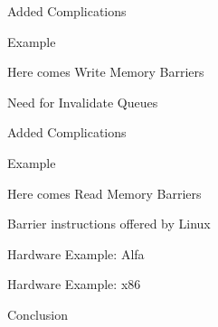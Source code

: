 \documentclass[notes, xcolor = dvipsnames]{beamer}
\begin{document}
    \begin{frame}{Added Complications}
        
    \end{frame}

    \begin{frame}{Example}

    \end{frame}

    \begin{frame}{Here comes Write Memory Barriers}
        
    \end{frame}

    \begin{frame}{Need for Invalidate Queues}
        
    \end{frame}

    \begin{frame}{Added Complications}
        
    \end{frame}

    \begin{frame}{Example}
        
    \end{frame}

    \begin{frame}{Here comes Read Memory Barriers}
        
    \end{frame}

    \begin{frame}{Barrier instructions offered by Linux}
        
    \end{frame}

    \begin{frame}{Hardware Example: Alfa}
        
    \end{frame}

    \begin{frame}{Hardware Example: x86}
    
    \end{frame}

    \begin{frame}{Conclusion}
        
    \end{frame}
\end{document}
